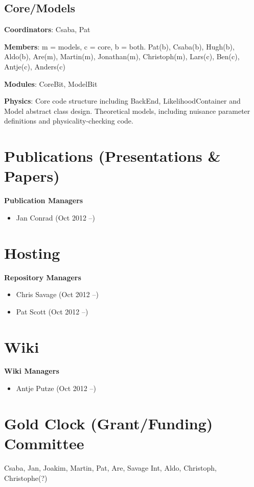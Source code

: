 \subsection{Core/Models}

\textbf{Coordinators}: Csaba, Pat

\textbf{Members}: m = models, c = core, b = both.  Pat(b), Csaba(b), Hugh(b), Aldo(b), Are(m), Martin(m), Jonathan(m), Christoph(m), Lars(c), Ben(c), Antje(c), Anders(c)

\textbf{Modules}: CoreBit, ModelBit

\textbf{Physics}: Core code structure including BackEnd, LikelihoodContainer and Model abstract class design. Theoretical models, including nuisance parameter definitions and physicality-checking code.


\section{Publications (Presentations \& Papers)}

\textbf{Publication Managers}
\begin{itemize}
\item Jan Conrad (Oct 2012 --)
\end{itemize}

\section{Hosting}

\textbf{Repository Managers}
\begin{itemize}
\item Chris Savage (Oct 2012 --)
\item Pat Scott (Oct 2012 --)
\end{itemize}

\section{Wiki}

\textbf{Wiki Managers}
\begin{itemize}
\item Antje Putze (Oct 2012 --)
\end{itemize}

\section{Gold Clock (Grant/Funding) Committee}
Csaba, Jan, Joakim, Martin, Pat, Are, Savage Int, Aldo, Christoph, Christophe(?)


